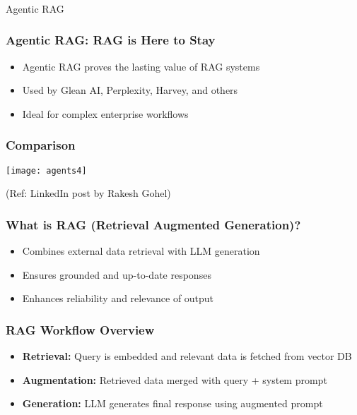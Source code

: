 \begin{frame}[fragile]\frametitle{}
\begin{center}
{\Large Agentic RAG}
\end{center}
\end{frame}

\begin{frame}[fragile]\frametitle{Agentic RAG: RAG is Here to Stay}
    \begin{itemize}
        \item Agentic RAG proves the lasting value of RAG systems
        \item Used by Glean AI, Perplexity, Harvey, and others
        \item Ideal for complex enterprise workflows
    \end{itemize}
\end{frame}

\begin{frame}[fragile]\frametitle{Comparison}
	
	\begin{center}
	\texttt{[image: agents4]}
	\end{center}
	
{\tiny (Ref: LinkedIn post by Rakesh Gohel)}

\end{frame}


\begin{frame}[fragile]\frametitle{What is RAG (Retrieval Augmented Generation)?}
    \begin{itemize}
        \item Combines external data retrieval with LLM generation
        \item Ensures grounded and up-to-date responses
        \item Enhances reliability and relevance of output
    \end{itemize}
\end{frame}

\begin{frame}[fragile]\frametitle{RAG Workflow Overview}
    \begin{itemize}
        \item \textbf{Retrieval:} Query is embedded and relevant data is fetched from vector DB
        \item \textbf{Augmentation:} Retrieved data merged with query + system prompt
        \item \textbf{Generation:} LLM generates final response using augmented prompt
    \end{itemize}
\end{frame}


